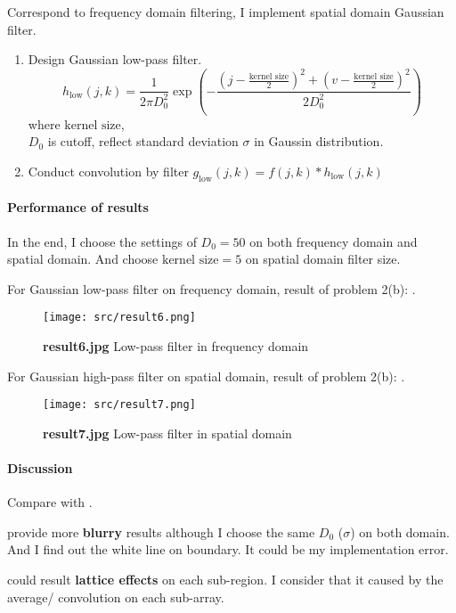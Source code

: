 Correspond to frequency domain filtering, I implement spatial domain Gaussian filter.
\begin{enumerate}
    \item Design Gaussian low-pass filter.
	\[
	    h_{\mbox{low}}(j, k) = \frac{1}{2 \pi D_{0}^{2}} \exp \left(-\frac{(j - \frac{\mbox{kernel size}}{2})^{2} + (v - \frac{\mbox{kernel size}}{2})^{2}}{2 D_{0}^{2}} \right)
	\]
	where \(\mbox{kernel size}\), \\
	\(D_{0}\) is cutoff, reflect standard deviation \(\sigma\) in Gaussin distribution.
    \item Conduct convolution by filter \(g_{\mbox{low}}(j, k) = f(j, k) \ast h_{\mbox{low}}(j, k)\) 
\end{enumerate}

\paragraph{Performance of results}
In the end, I choose the settings of \(D_{0}=50\) on both frequency domain and spatial domain. And choose \(\mbox{kernel size} = 5\) on spatial domain filter size.

For Gaussian low-pass filter on frequency domain,
result of problem 2(b): .
\begin{figure}
    \centering
    \texttt{[image: src/result6.png]}
    \caption{\textbf{result6.jpg} Low-pass filter in frequency domain}
    \label{result6}
\end{figure}

For Gaussian high-pass filter on spatial domain,
result of problem 2(b): .
\begin{figure}
    \centering
    \texttt{[image: src/result7.png]}
    \caption{\textbf{result7.jpg} Low-pass filter in spatial domain}
    \label{result7}
\end{figure}

\paragraph{Discussion}
Compare  with .

 provide more \textbf{blurry} results although I choose the same \(D_{0}\) (\(\sigma\)) on both domain. And I find out the white line on boundary. It could be my implementation error.

 could result \textbf{lattice effects} on each sub-region. I consider that it caused by the average/ convolution on each sub-array.

